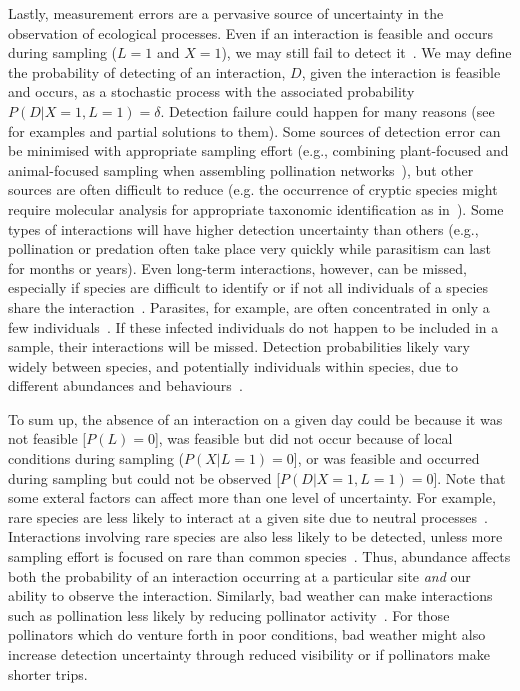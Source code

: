 \documentclass[12pt]{article}
\begin{document}
\begin{spacing}{2.0}
          Lastly, measurement errors are a pervasive source of uncertainty in the observation of ecological processes. Even if an interaction is feasible and occurs during sampling ($L = 1$ and $X = 1$), we may still fail to detect it~\citep{Jordano2016,Weinstein2017}. We may define the probability of detecting of an interaction, $D$, given the interaction is feasible and occurs, as a stochastic process with the associated probability $P(D|X=1,L=1)=\delta$. Detection failure could happen for many reasons (see~\citet{Wirta2014} for examples and partial solutions to them). Some sources of detection error can be minimised with appropriate sampling effort (e.g., combining plant-focused and animal-focused sampling when assembling pollination networks~\citet{Jordano2016}), but other sources are often difficult to reduce (e.g. the occurrence of cryptic species might require molecular analysis for appropriate taxonomic identification as in~\citealt{Wirta2014,Frost2016}). Some types of interactions will have higher detection uncertainty than others (e.g., pollination or predation often take place very quickly while parasitism can last for months or years). Even long-term interactions, however, can be missed, especially if species are difficult to identify or if not all individuals of a species share the interaction~\citep{Wells2013}. Parasites, for example, are often concentrated in only a few individuals~\citep{Lagrue2017}. If these infected individuals do not happen to be included in a sample, their interactions will be missed. Detection probabilities likely vary widely between species, and potentially individuals within species, due to different abundances and behaviours~\citep{Wells2013,Weinstein2017}.


      To sum up, the absence of an interaction on a given day could  be because it was not feasible [$P(L) = 0$], was feasible but did not occur because of local conditions during sampling ($P(X|L=1) = 0$], or was feasible and occurred during sampling but could not be observed [$P(D|X=1,L=1)=0$]. Note that some exteral factors can affect more than one level of uncertainty. For example, rare species are less likely to interact at a given site due to neutral processes~\citep{}. Interactions involving rare species are also less likely to be detected, unless more sampling effort is focused on rare than common species~\citep{Jordano2016}. Thus, abundance affects both the probability of an interaction occurring at a particular site \emph{and} our ability to observe the interaction. Similarly, bad weather can make interactions such as pollination less likely by reducing pollinator activity~\citep{}. For those pollinators which do venture forth in poor conditions, bad weather might also  increase detection uncertainty through reduced visibility or if pollinators make shorter trips. 



\end{spacing}
\end{document}
